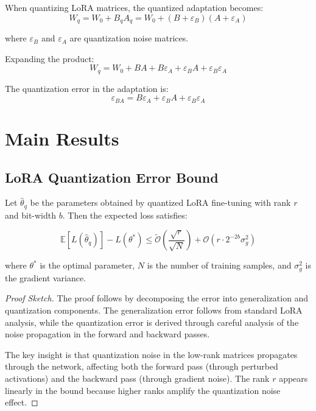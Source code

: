 \documentclass[10pt,twocolumn]{article}
\newcommand{\tilde}{\widetilde}
\begin{document}
When quantizing LoRA matrices, the quantized adaptation becomes:
\begin{equation}
W_q = W_0 + B_q A_q = W_0 + (B + \varepsilon_B)(A + \varepsilon_A)
\end{equation}

where $\varepsilon_B$ and $\varepsilon_A$ are quantization noise matrices.

Expanding the product:
\begin{equation}
W_q = W_0 + BA + B\varepsilon_A + \varepsilon_B A + \varepsilon_B \varepsilon_A
\end{equation}

The quantization error in the adaptation is:
\begin{equation}
\varepsilon_{BA} = B\varepsilon_A + \varepsilon_B A + \varepsilon_B \varepsilon_A
\end{equation}

\section{Main Results}

\subsection{LoRA Quantization Error Bound}

\begin{theorem}
\label{thm:main_bound}
Let $\hat{\theta}_q$ be the parameters obtained by quantized LoRA fine-tuning with rank $r$ and bit-width $b$. Then the expected loss satisfies:

\begin{equation}
\mathbb{E}[L(\hat{\theta}_q)] - L(\theta^*) \leq \tilde{\mathcal{O}}\left(\frac{\sqrt{r}}{\sqrt{N}}\right) + \mathcal{O}\left(r \cdot 2^{-2b} \sigma_g^2\right)
\end{equation}

where $\theta^*$ is the optimal parameter, $N$ is the number of training samples, and $\sigma_g^2$ is the gradient variance.
\end{theorem}

\begin{proof}[Proof Sketch]
The proof follows by decomposing the error into generalization and quantization components. The generalization error follows from standard LoRA analysis, while the quantization error is derived through careful analysis of the noise propagation in the forward and backward passes.

The key insight is that quantization noise in the low-rank matrices propagates through the network, affecting both the forward pass (through perturbed activations) and the backward pass (through gradient noise). The rank $r$ appears linearly in the bound because higher ranks amplify the quantization noise effect.
\end{proof}
\end{document}
